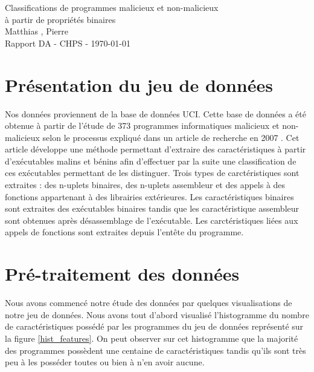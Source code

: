 \documentclass[11pt,a4paper]{article}
\begin{document}
\begin{center}

	{\LARGE\centering Classifications de programmes malicieux et non-malicieux\\ à partir de propriétés binaires}\\[1cm]

	{ Matthias , Pierre }\\[0.5cm]
	{Rapport DA - CHPS - \today}
\end{center}

\tableofcontents

\section{Présentation du jeu de données}
	Nos données proviennent de la base de données UCI\cite{UCI}.
	Cette base de données a été obtenue à partir de l'étude de 373 programmes informatiques malicieux et non-malicieux selon le processus expliqué dans un article de recherche en 2007 \cite{article}. Cet article développe une méthode permettant d'extraire des caractéristiques à partir d'exécutables malins et bénins afin d'effectuer par la suite une classification de ces exécutables permettant de les distinguer. Trois types de carctéristiques sont extraites : des n-uplets binaires, des n-uplets assembleur et des appels à des fonctions appartenant à des librairies extérieures. Les caractéristiques binaires sont extraites des exécutables binaires tandis que les caractéristique assembleur sont obtenues après désassemblage de l'exécutable. Les carctéristiques liées aux appels de fonctions sont extraites depuis l'entête du programme.

\section{Pré-traitement des données}
	Nous avons commencé notre étude des données par quelques visualisations de notre jeu de données. Nous avons tout d'abord visualisé l'histogramme du nombre de caractéristiques possédé par les programmes du jeu de données représenté sur la figure \ref{hist_features}. On peut observer sur cet histogramme que la majorité des programmes possèdent une centaine de caractéristiques tandis qu'ils sont très peu à les posséder toutes ou bien à n'en avoir aucune.
\end{document}
